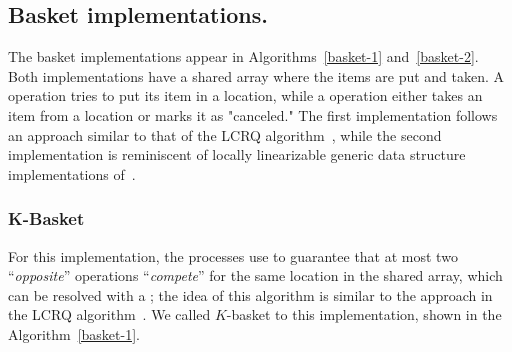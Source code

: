 


\subsection{\label{subsec:basket-implementation}Basket implementations.}
The basket implementations appear in Algorithms~\ref{basket-1} and~\ref{basket-2}. Both implementations have a shared array where the items are put and taken. A \Put operation tries to put its item in a location, while a \Take operation either takes an item from a location or marks it as "canceled."  The first implementation follows an approach similar to that of the LCRQ algorithm~\cite{ppopp2013x86queues}, while the second implementation is reminiscent of locally linearizable generic data structure implementations of~\cite{DBLP_conf_concur_HaasHHKLPSSV16}.

\subsubsection{K-Basket}

For this implementation, the processes use \FAI to guarantee that at most two ``\textit{opposite}'' operations ``\textit{compete}'' for the same location in the shared array, which can be resolved with a \SWAP; the idea of this algorithm is similar to the approach in the LCRQ algorithm~\cite{ppopp2013x86queues}. We called \(K\)-basket to this implementation, shown in the Algorithm~\ref{basket-1}.



